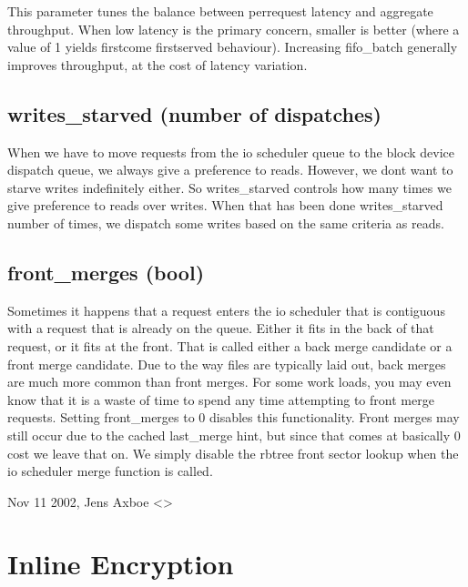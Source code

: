 \documentclass[a4paper,11pt,english]{sphinxmanual}
\begin{document}
This parameter tunes the balance between per\sphinxhyphen{}request latency and aggregate
throughput.  When low latency is the primary concern, smaller is better (where
a value of 1 yields first\sphinxhyphen{}come first\sphinxhyphen{}served behaviour).  Increasing fifo\_batch
generally improves throughput, at the cost of latency variation.


\section{writes\_starved  (number of dispatches)}
\label{\detokenize{deadline-iosched:writes-starved-number-of-dispatches}}
When we have to move requests from the io scheduler queue to the block
device dispatch queue, we always give a preference to reads. However, we
don\textquotesingle{}t want to starve writes indefinitely either. So writes\_starved controls
how many times we give preference to reads over writes. When that has been
done writes\_starved number of times, we dispatch some writes based on the
same criteria as reads.


\section{front\_merges    (bool)}
\label{\detokenize{deadline-iosched:front-merges-bool}}
Sometimes it happens that a request enters the io scheduler that is contiguous
with a request that is already on the queue. Either it fits in the back of that
request, or it fits at the front. That is called either a back merge candidate
or a front merge candidate. Due to the way files are typically laid out,
back merges are much more common than front merges. For some work loads, you
may even know that it is a waste of time to spend any time attempting to
front merge requests. Setting front\_merges to 0 disables this functionality.
Front merges may still occur due to the cached last\_merge hint, but since
that comes at basically 0 cost we leave that on. We simply disable the
rbtree front sector lookup when the io scheduler merge function is called.

Nov 11 2002, Jens Axboe \textless{}\textgreater{}


\chapter{Inline Encryption}
\label{\detokenize{inline-encryption:inline-encryption-1}}\label{\detokenize{inline-encryption:inline-encryption}}\label{\detokenize{inline-encryption::doc}}
\end{document}
